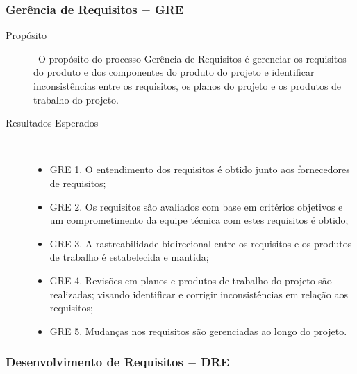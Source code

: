   \subsubsection{Gerência de Requisitos $-$ GRE}

    \begin{description}
      \item[Propósito] \
        O propósito do processo Gerência de Requisitos é gerenciar os requisitos do
        produto e dos componentes do produto do projeto e identificar inconsistências
        entre os requisitos, os planos do projeto e os produtos de trabalho do projeto.
      \item [Resultados Esperados] \
        \begin{itemize}
          \item GRE 1. O entendimento dos requisitos é obtido junto aos fornecedores de requisitos;
          \item GRE 2. Os requisitos são avaliados com base em critérios objetivos e um comprometimento
                da equipe técnica com estes requisitos é obtido;
          \item GRE 3. A rastreabilidade bidirecional entre os requisitos e os produtos de trabalho
                é estabelecida e mantida;
          \item GRE 4. Revisões em planos e produtos de trabalho do projeto são realizadas;
                visando identificar e corrigir inconsistências em relação aos requisitos;
          \item GRE 5. Mudanças nos requisitos são gerenciadas ao longo do projeto.
        \end{itemize}
      \end{description}

  \subsubsection{Desenvolvimento de Requisitos $-$ DRE}

